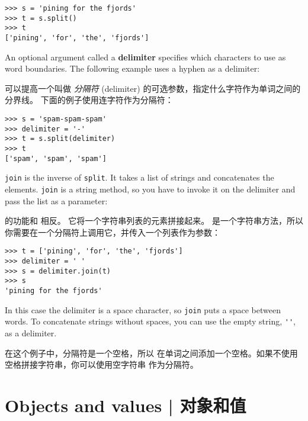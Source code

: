   

\begin{lstlisting}
>>> s = 'pining for the fjords'
>>> t = s.split()
>>> t
['pining', 'for', 'the', 'fjords']
\end{lstlisting}

%
An optional argument called a {\bf delimiter} specifies which
characters to use as word boundaries.
The following example
uses a hyphen as a delimiter:

可以提高一个叫做 {\em 分隔符} (delimiter) 的可选参数，指定什么字符作为单词之间的分界线。 下面的例子使用连字符作为分隔符：

  

\begin{lstlisting}
>>> s = 'spam-spam-spam'
>>> delimiter = '-'
>>> t = s.split(delimiter)
>>> t
['spam', 'spam', 'spam']
\end{lstlisting}

%
{\tt join} is the inverse of {\tt split}.  It
takes a list of strings and
concatenates the elements.  {\tt join} is a string method,
so you have to invoke it on the delimiter and pass the
list as a parameter:

 的功能和  相反。 它将一个字符串列表的元素拼接起来。  是一个字符串方法，所以你需要在一个分隔符上调用它，并传入一个列表作为参数：

  

\begin{lstlisting}
>>> t = ['pining', 'for', 'the', 'fjords']
>>> delimiter = ' '
>>> s = delimiter.join(t)
>>> s
'pining for the fjords'
\end{lstlisting}

%
In this case the delimiter is a space character, so
{\tt join} puts a space between words.  To concatenate
strings without spaces, you can use the empty string,
\verb"''", as a delimiter.

在这个例子中，分隔符是一个空格，所以  在单词之间添加一个空格。如果不使用空格拼接字符串，你可以使用空字符串  作为分隔符。

  


\section{Objects and values  |  对象和值}
\label{equivalence}
  

